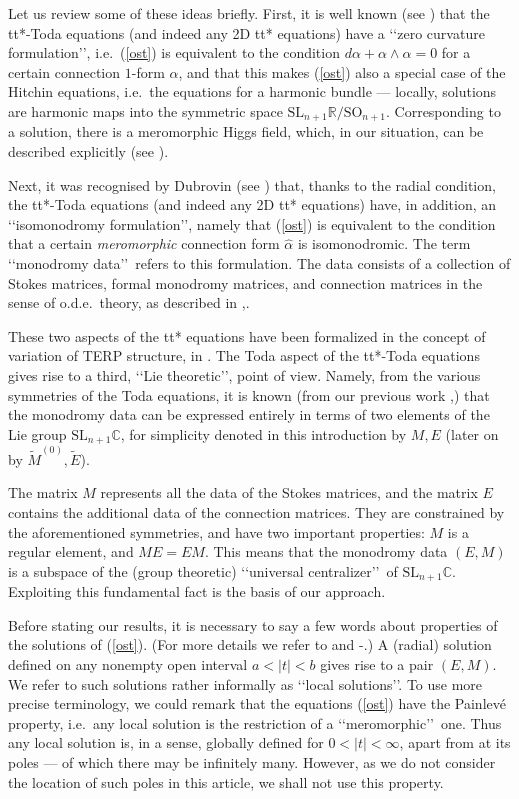 \documentclass[a4paper,12pt,leqno]{amsart}
\numberwithin{equation}{section}
\theoremstyle{plain}
\theoremstyle{definition}
\newcommand{\C}{\mathbb C}
\newcommand{\R}{\mathbb R}
\newcommand{\al}{\alpha}
\newcommand{\SL}{\textrm{SL}}
\newcommand{\SO}{\textrm{SO}}
\renewcommand{\ll}{\lq\lq}
\newcommand{\rr}{\rq\rq\ }
\newcommand{\rrr}{\rq\rq}
\newcommand{\tE}{  \tilde E  }
\newcommand{\tMz}{  \tilde M^{(0)}  }
\begin{document}
Let us review some of these ideas briefly.
First, it is well known (see \cite{GuLi14})
that the tt*-Toda equations (and indeed any 2D tt* equations) have a \ll zero curvature formulation\rrr, i.e.\ (\ref{ost}) is equivalent to the condition $d\al+\al\wedge\al=0$ for a certain connection $1$-form $\al$, and that this makes (\ref{ost})
also a special case of the Hitchin equations, i.e.\ the equations for a harmonic bundle --- locally, solutions are harmonic maps into the symmetric space $\SL_{n+1}\R/\SO_{n+1}$.
Corresponding to a solution, there is a
meromorphic
Higgs field, which, in our situation, can be described explicitly (see \cite{GIL3}).

Next, it was recognised by Dubrovin (see \cite{Du93}) that, thanks to the radial condition,  the tt*-Toda equations (and indeed any 2D tt* equations)  have, in addition, an \ll isomonodromy formulation\rrr, namely that
(\ref{ost}) is  equivalent to the condition that a certain {\em meromorphic} connection form $\hat\al$ is isomonodromic.  The term \ll monodromy data\rr refers to this formulation. The data consists of a collection of Stokes matrices, formal monodromy matrices, and connection matrices in the sense of o.d.e.\ theory, as described in \cite{GIL3},\cite{GILX}.

These two aspects of the tt* equations have been formalized in the concept of variation of TERP structure, in \cite{He03}.
The Toda aspect of the tt*-Toda equations gives rise to a third, \ll Lie theoretic\rrr, point of view. Namely, from the various symmetries of the Toda equations, it is known (from our previous work  \cite{GH1},\cite{GH2})
that the monodromy data can be expressed entirely in terms of two elements of the Lie group
$\SL_{n+1}\C$, for simplicity denoted in this introduction by $M,E$ (later on by $\tMz,\tE$).

The matrix $M$ represents all the data of the Stokes matrices, and
the matrix $E$ contains the additional data of the connection matrices.  They are constrained by the aforementioned symmetries, and have two important properties: $M$ is a regular element,
and $ME=EM$.
This means that the monodromy data $(E,M)$ is a subspace of the (group theoretic) \ll universal centralizer\rr of
$\SL_{n+1}\C$. Exploiting this fundamental fact is the basis of our approach.

Before stating our results, it is necessary to say a few words about properties of the solutions of (\ref{ost}).
(For more details we refer to \cite{GH17} and
\cite{GIL1}-\cite{GuLi14}.)
A (radial) solution defined on any nonempty open interval $a<\vert t\vert < b$ gives rise to a pair $(E,M)$. We refer to such solutions rather informally as \ll local solutions\rrr.  To use more precise terminology, we could remark that the equations
(\ref{ost})
have the Painlev\'e property, i.e.\ any local solution is the restriction of a \ll meromorphic\rr one.  Thus any local solution is, in a sense, globally defined for $0<\vert t\vert<\infty$, apart from at its poles --- of which there may be infinitely many. However, as we do not consider the location of such poles in this article, we shall not use this property.
\end{document}
